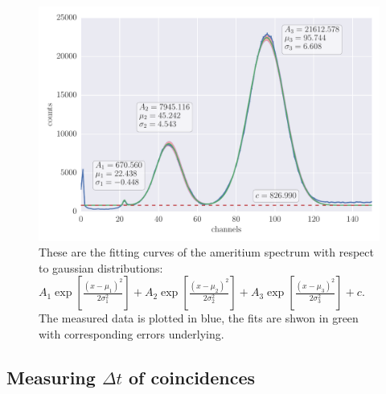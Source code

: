 \clearpage
\begin{figure}[htpb]
    \centering
    \includegraphics[width=1.0\linewidth]{analysis/figures/plot6_3_reg}
    \caption{
        These are the fitting curves of the ameritium spectrum with respect to gaussian distributions:
        $A_1\exp{\left[\frac{(x-\mu_1)^2}{2 \sigma_1^2} \right]}+
         A_2\exp{\left[\frac{(x-\mu_2)^2}{2 \sigma_2^2} \right]}+
         A_3\exp{\left[\frac{(x-\mu_3)^2}{2 \sigma_3^2} \right]}+ c$.
        The measured data is plotted in blue, the fits are shwon in green with corresponding 
        errors underlying. 
        }
    \label{fig:name}
\end{figure}
\subsection{Measuring $\Delta t$ of coincidences}


